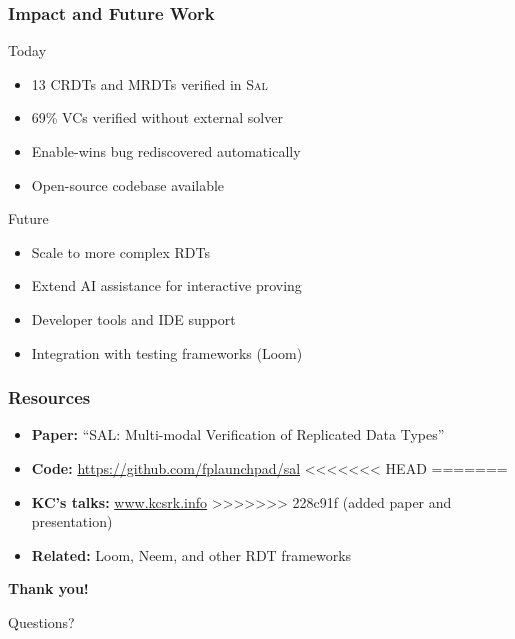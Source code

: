 \documentclass[usepdftitle=false]{beamer}
\newcommand{\sal}{\textsc{Sal}\xspace}
\begin{document}
\begin{frame}
  \frametitle{Impact and Future Work}
  
  \begin{block}{Today}
    \begin{itemize}
      \item 13 CRDTs and MRDTs verified in \sal
      \item 69\% VCs verified without external solver
      \item Enable-wins bug rediscovered automatically
      \item Open-source codebase available
    \end{itemize}
  \end{block}
  
  \vspace{0.3cm}
  \begin{block}{Future}
    \begin{itemize}
      \item Scale to more complex RDTs
      \item Extend AI assistance for interactive proving
      \item Developer tools and IDE support
      \item Integration with testing frameworks (Loom)
    \end{itemize}
  \end{block}
\end{frame}

\begin{frame}
  \frametitle{Resources}
  
  \begin{itemize}
    \item \textbf{Paper:} ``SAL: Multi-modal Verification of Replicated Data Types''
    \item \textbf{Code:} \url{https://github.com/fplaunchpad/sal}
<<<<<<< HEAD
=======
    \item \textbf{KC's talks:} \url{www.kcsrk.info}
>>>>>>> 228c91f (added paper and presentation)
    \item \textbf{Related:} Loom, Neem, and other RDT frameworks
  \end{itemize}
  
  \vspace{0.5cm}
  \centering
  \Large\textbf{Thank you!}
  
  \vspace{0.3cm}
  \normalsize Questions?
\end{frame}
\end{document}
